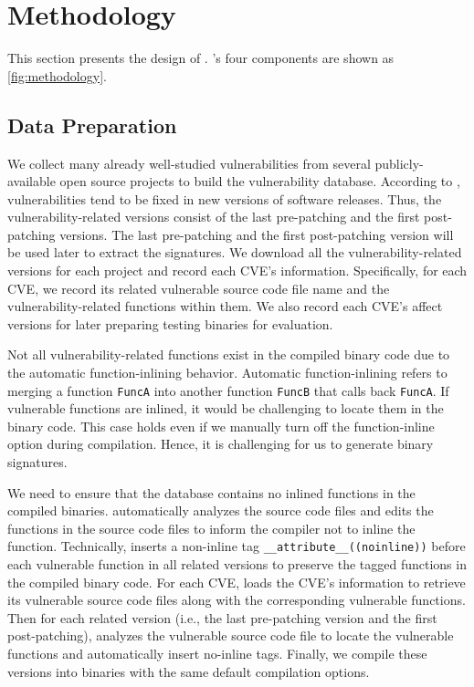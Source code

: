 \section{Methodology}
\label{sec:methdlg}


This section presents the design of \name. \name's four components are shown as \autoref{fig:methodology}. 


\subsection{Data Preparation}
\label{sec:data preparation}
We collect many already well-studied vulnerabilities from several publicly-available open source projects to build the vulnerability database. 
According to \cite{viva}, vulnerabilities tend to be fixed in new versions of software releases. 
Thus, the vulnerability-related versions consist of the last pre-patching and the first post-patching versions.
The last pre-patching and the first post-patching version will be used later to extract the signatures.
We download all the vulnerability-related versions for each project and record each CVE's information. 
Specifically, for each CVE, we record its related vulnerable source code file name and the vulnerability-related functions within them. 
We also record each CVE's affect versions for later preparing testing binaries for evaluation. 


Not all vulnerability-related functions exist in the compiled binary code due to the automatic function-inlining behavior. 
Automatic function-inlining refers to merging a function \texttt{FuncA} into another function \texttt{FuncB} that calls back \texttt{FuncA}. 
If vulnerable functions are inlined, it would be challenging to locate them in the binary code. 
This case holds even if we manually turn off the function-inline option during compilation. 
Hence, it is challenging for us to generate binary signatures. 


We need to ensure that the database contains no inlined functions in the compiled binaries.
\name automatically analyzes the source code files and edits the functions in the source code files to inform the compiler not to inline the function.
Technically, \name inserts a non-inline tag \texttt{\_\_attribute\_\_((noinline))} before each vulnerable function in all related versions to preserve the tagged functions in the compiled binary code. 
For each CVE, \name loads the CVE's information to retrieve its vulnerable source code files along with the corresponding vulnerable functions. 
Then for each related version (i.e., the last pre-patching version and the first post-patching), \name analyzes the vulnerable source code file to locate the vulnerable functions and automatically insert no-inline tags. 
Finally, we compile these versions into binaries with the same default compilation options. 



